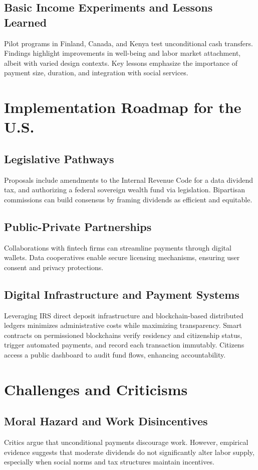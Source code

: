 \documentclass[11pt]{article}
\begin{document}
\subsection{Basic Income Experiments and Lessons Learned}
Pilot programs in Finland, Canada, and Kenya test unconditional cash transfers. Findings highlight improvements in well-being and labor market attachment, albeit with varied design contexts. Key lessons emphasize the importance of payment size, duration, and integration with social services.

\section{Implementation Roadmap for the U.S.}
\subsection{Legislative Pathways}
Proposals include amendments to the Internal Revenue Code for a data dividend tax, and authorizing a federal sovereign wealth fund via legislation. Bipartisan commissions can build consensus by framing dividends as efficient and equitable.

\subsection{Public-Private Partnerships}
Collaborations with fintech firms can streamline payments through digital wallets. Data cooperatives enable secure licensing mechanisms, ensuring user consent and privacy protections.

\subsection{Digital Infrastructure and Payment Systems}
Leveraging IRS direct deposit infrastructure and blockchain-based distributed ledgers minimizes administrative costs while maximizing transparency. Smart contracts on permissioned blockchains verify residency and citizenship status, trigger automated payments, and record each transaction immutably. Citizens access a public dashboard to audit fund flows, enhancing accountability.

\section{Challenges and Criticisms}
\subsection{Moral Hazard and Work Disincentives}
Critics argue that unconditional payments discourage work. However, empirical evidence suggests that moderate dividends do not significantly alter labor supply, especially when social norms and tax structures maintain incentives.
\end{document}

